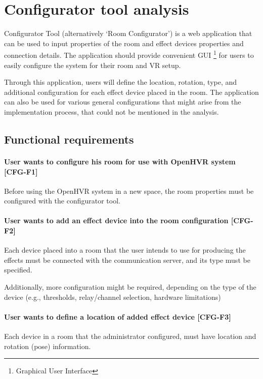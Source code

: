 \hypertarget{x-configurator-tool-analysis}{\section{Configurator tool analysis}}
Configurator Tool (alternatively `Room Configurator') is a web application that
can be used to input properties of the room and effect devices properties and
connection details.
The application should provide convenient GUI \footnote{Graphical User Interface}
for users to easily configure the system for their room and VR setup.


Through this application, users will define the location, rotation, type, and
additional configuration for each effect device placed in the room. The application
can also be used for various general configurations that might arise from
the implementation process, that could not be mentioned in the analysis.


\subsection*{Functional requirements}
\hypertarget{x-\textbf{user-wants-to-configure-his-room-for-use-with-openhvr-system}-[cfg-f1]}{\paragraph*{\textbf{User wants to configure his room for use with OpenHVR system} [CFG-F1]}}
Before using the OpenHVR system in a new space,
the room properties must be configured with the configurator tool.


\hypertarget{x-\textbf{user-wants-to-add-an-effect-device-into-the-configuration}-[cfg-f2]}{\paragraph*{\textbf{User wants to add an effect device into the room configuration} [CFG-F2]}}
Each device placed into a room that the user intends to use for producing the effects
must be connected with the communication server, and its type must be specified.


Additionally, more configuration might be required, depending on the type
of the device (e.g., thresholds, relay/channel selection, hardware limitations)


\hypertarget{x-\textbf{user-wants-to-define-a-location-of-added-effect-device}-[cfg-f3]}{\paragraph*{\textbf{User wants to define a location of added effect device} [CFG-F3]}}
Each device in a room that the administrator configured,
must have location and rotation (pose) information.


